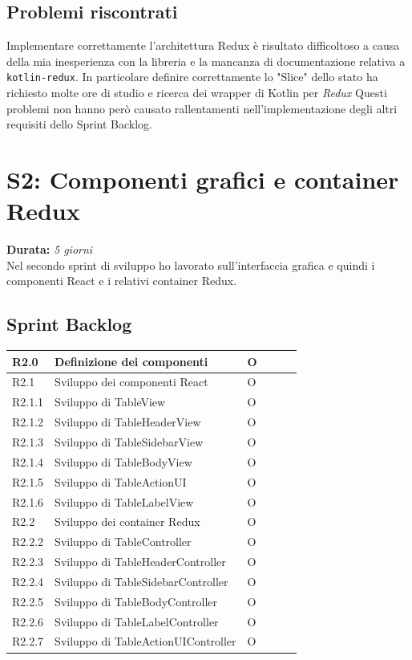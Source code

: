 \subsection{Problemi riscontrati}
Implementare correttamente l'architettura Redux è risultato difficoltoso a causa della mia inesperienza con la libreria e la mancanza di documentazione relativa a \verb|kotlin-redux|. In particolare definire correttamente lo "Slice" dello stato ha richiesto molte ore di studio e ricerca dei wrapper di Kotlin per \emph{Redux} Questi problemi non hanno però causato rallentamenti nell'implementazione degli altri requisiti dello Sprint Backlog.

\newpage

\section{S2: Componenti grafici e container Redux}
\textbf{Durata:} \textit{5 giorni} \\
Nel secondo sprint di sviluppo ho lavorato sull'interfaccia grafica e quindi i componenti React e i relativi container Redux.

\subsection{Sprint Backlog}
\begin{longtable} {
		|>{}p{10mm}| 
		|>{}p{90mm}|
		|>{}p{15mm}|
		|>{}p{15mm}|
		|>{}p{15mm}|
		>{}p{0mm}}
	\hline
R2.0   & \textbf{Definizione dei componenti} & O\\ \hline
R2.1   & Sviluppo dei componenti React 		  & O\\ \hline
R2.1.1 & Sviluppo di TableView                & O\\ \hline
R2.1.2 & Sviluppo di TableHeaderView          & O\\ \hline
R2.1.3 & Sviluppo di TableSidebarView         & O \\ \hline
R2.1.4 & Sviluppo di TableBodyView            & O\\ \hline
R2.1.5 & Sviluppo di TableActionUI            & O\\ \hline
R2.1.6 & Sviluppo di TableLabelView            & O\\ \hline
R2.2   & Sviluppo dei container Redux         & O  \\ \hline
R2.2.2 & Sviluppo di TableController          & O   \\ \hline
R2.2.3 & Sviluppo di TableHeaderController    & O      \\ \hline
R2.2.4 & Sviluppo di TableSidebarController   & O      \\ \hline
R2.2.5 & Sviluppo di TableBodyController      & O   \\ \hline
R2.2.6 & Sviluppo di TableLabelController   & O      \\ \hline
R2.2.7 & Sviluppo di TableActionUIController      & O   \\ \hline
\end{longtable}


